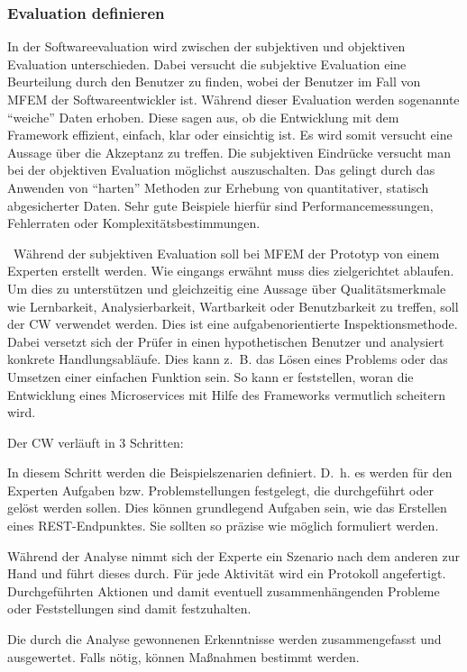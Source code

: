 \subsubsection{Evaluation definieren}\label{Evaluation_definieren}

In der Softwareevaluation wird zwischen der subjektiven und objektiven Evaluation unterschieden\cite{Hegner2016}.
Dabei versucht die subjektive Evaluation eine Beurteilung durch den Benutzer zu finden, wobei der Benutzer im Fall von \ac{MFEM} der Softwareentwickler ist. Während dieser Evaluation werden sogenannte \enquote{weiche} Daten erhoben. Diese sagen aus, ob die Entwicklung mit dem Framework effizient, einfach, klar oder einsichtig ist. Es wird somit versucht eine Aussage über die Akzeptanz zu treffen.
Die subjektiven Eindrücke versucht man bei der objektiven Evaluation möglichst auszuschalten. Das gelingt durch das Anwenden von \enquote{harten} Methoden zur Erhebung von quantitativer, statisch abgesicherter Daten\cite{Hegner2016}. Sehr gute Beispiele hierfür sind Performancemessungen, Fehlerraten oder Komplexitätsbestimmungen.  

\
Während der subjektiven Evaluation soll bei \ac{MFEM} der Prototyp von einem Experten erstellt werden. Wie eingangs erwähnt muss dies zielgerichtet ablaufen. Um dies zu unterstützen und gleichzeitig eine Aussage über Qualitätsmerkmale wie Lernbarkeit, Analysierbarkeit, Wartbarkeit oder Benutzbarkeit zu treffen, soll der \ac{CW} verwendet werden. Dies ist eine aufgabenorientierte Inspektionsmethode\cite{Hegner2016}. Dabei versetzt sich der Prüfer in einen hypothetischen Benutzer und analysiert konkrete Handlungsabläufe. Dies kann z.~B. das Lösen eines Problems oder das Umsetzen einer einfachen Funktion sein. 
So kann er feststellen, woran die Entwicklung eines Microservices mit Hilfe des Frameworks vermutlich scheitern wird.

Der \ac{CW} verläuft in 3 Schritten\cite{Hegner2016}:

\begin{description}[leftmargin=!,labelwidth=\widthof{\bfseries Input definieren}]
	\item[1. Vorbereitung]
	In diesem Schritt werden die Beispielszenarien definiert. D.~h. es werden für den Experten Aufgaben bzw. Problemstellungen festgelegt, die durchgeführt oder gelöst werden sollen. Dies können grundlegend Aufgaben sein, wie das Erstellen eines \ac{REST}-Endpunktes. Sie sollten so präzise wie möglich formuliert werden.
	\item[2. Analyse]
	Während der Analyse nimmt sich der Experte ein Szenario nach dem anderen zur Hand und führt dieses durch. Für jede Aktivität wird ein Protokoll angefertigt. Durchgeführten Aktionen und damit eventuell zusammenhängenden Probleme oder Feststellungen sind damit festzuhalten.
	\item[3. Follow Up]
	Die durch die Analyse gewonnenen Erkenntnisse werden zusammengefasst und ausgewertet. Falls nötig, können Maßnahmen bestimmt werden.
\end{description}

